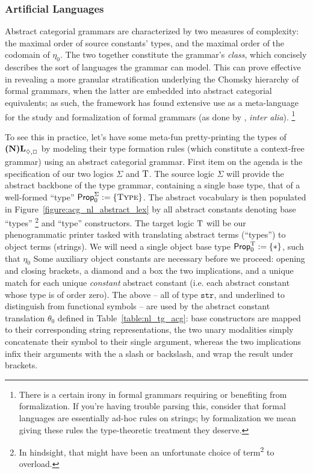 \subsubsection{Artificial Languages}
Abstract categorial grammars are characterized by two measures of complexity: the maximal order of source constants' types, and the maximal order of the codomain of $\eta_0$.
The two together constitute the grammar's \textit{class}, which concisely describes the sort of languages the grammar can model.
This can prove effective in revealing a more granular stratification underlying the Chomsky hierarchy of formal grammars, when the latter are embedded into abstract categorial equivalents; as such, the framework has found extensive use as a meta-language for the study and formalization of formal grammars (as done by \citet{de2004expressive}, \textit{inter alia}).
\footnote{There is a certain irony in formal grammars requiring or benefiting from formalization. If you're having trouble parsing this, consider that formal languages are essentially ad-hoc rules on strings; by formalization we mean giving these rules the type-theoretic treatment they deserve.}

To see this in practice, let's have some meta-fun pretty-printing the types of $\logic{(N)L}_{\diamond, \Box}$ by modeling their type formation rules (which constitute a context-free grammar) using an abstract categorial grammar.
First item on the agenda is the specification of our two logics $\Sigma$ and $\mathrm{T}$.
The source logic $\Sigma$ will provide the abstract backbone of the type grammar, containing a single base type, that of a well-formed ``type'' 
$\propcon^{\Sigma} := \{ \type[s] \}$.
The abstract vocabulary is then populated in Figure~\ref{figure:acg_nl_abstract_lex} by all abstract constants denoting base ``types''%
\footnote{In hindsight, that might have been an unfortunate choice of term\textsuperscript{2} to overload.} and ``type'' constructors.
The target logic $\mathrm{T}$ will be our phenogrammatic printer tasked with translating abstract terms (``types'') to object terms (strings).
We will need a single object base type  $\mathsf{Prop}_0^{\mathrm{T}} := \{ * \}$, such that $\eta_0$ 
Some auxiliary object constants are necessary before we proceed: opening and closing brackets, a diamond and a box the two implications, and a unique match for each unique \textit{constant} abstract constant (i.e. each abstract constant whose type is of order zero).
The above -- all of type $\mathtt{str}$, and underlined to distinguish from functional symbols -- are used by the abstract constant translation $\theta_0$ defined in Table~\ref{table:nl_tg_acg}: base constructors are mapped to their corresponding string representations, the two unary modalities simply concatenate their symbol to their single argument, whereas the two implications infix their arguments with the a slash or backslash, and wrap the result under brackets.

